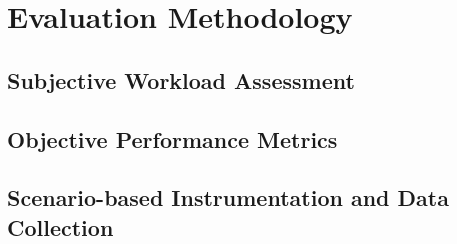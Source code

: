 \section{Evaluation Methodology}\label{sec:evaluation-methodology}

\subsection{Subjective Workload Assessment}\label{subsec:subjective-workload-assessment}

\subsection{Objective Performance Metrics}\label{subsec:objective-performance-metrics}

\subsection{Scenario-based Instrumentation and Data Collection}\label{subsec:scenario-based-instrumentation-and-data-collection}
